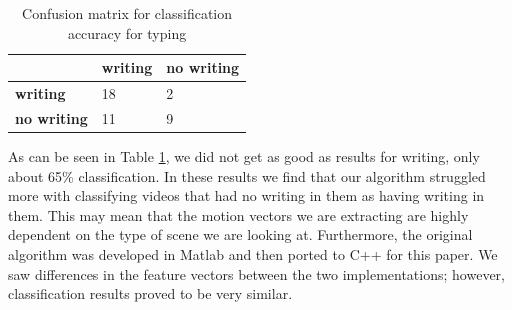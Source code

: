 
\FloatBarrier

\begin{table}[h]
  \begin{centering}
  \begin{tabular}{| l | l | l |}
  \hline
   & \textbf{writing} & \textbf{no writing}\\ \hline
  \textbf{writing} & 18 & 2 \\ \hline
  \textbf{no writing} & 11 & 9 \\ \hline
  \end{tabular}
  \caption{Confusion matrix for classification accuracy for typing}
  \label{tab:writing_confusion}
\end{centering}
\end{table}

As can be seen in Table \ref{tab:writing_confusion}, we did not get as good
as results for writing, only about 65\% classification. In these results we
find that our algorithm struggled more with classifying videos that had no
writing in them as having writing in them. This may mean that the motion vectors
we are extracting are highly dependent on the type of scene we are looking at. Furthermore,
the original algorithm was developed in Matlab and then ported to C++ for this paper. We
saw differences in the feature vectors between the two implementations; however,
classification results proved to be very similar.

